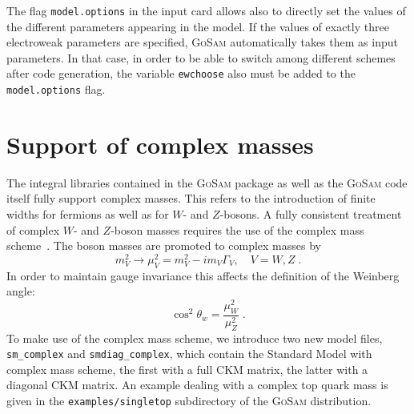 \documentclass[11pt,a4paper]{refrep}
\newcommand{\gosam}{\textsc{GoSam}\xspace}
\begin{document}
The flag {\tt model.options} in the input card allows also to directly
set the values of the different parameters appearing in the model. If
the values of exactly three electroweak parameters are
specified, \gosam{} automatically takes them as input parameters. In
that case, in order to be able to switch among different schemes after
code generation, the variable {\tt ewchoose} also must be added to the
{\tt model.options} flag.



\section{Support of complex masses}
\label{sec:complexmasses}
The integral libraries contained in the \gosam{} package as well as the \gosam{} 
code itself fully support complex masses. This refers to the introduction of 
finite widths for fermions as well as
for $W$- and $Z$-bosons. A fully consistent treatment of complex
$W$- and $Z$-boson masses requires the use of the complex mass scheme~\cite{Denner:2005fg}.
The boson masses are promoted to complex masses by
\begin{equation}
 m_{V}^2 \to \mu_{V}^2 = m_{V}^2 -i m_{V} \Gamma_{V},\quad V=W,Z\;.
\end{equation}
In order to maintain gauge invariance this affects the definition of the Weinberg angle:
\begin{equation}
 \cos^2\theta_w = \frac{\mu_W^2}{\mu_Z^2}\;.
\end{equation}
 To make use of the complex mass scheme, we introduce two new model files, \texttt{sm\_complex}
 and \texttt{smdiag\_complex}, which contain the Standard Model with complex mass scheme, the first
 with a full CKM matrix, the latter with a diagonal  CKM matrix.
 An example dealing with a complex top quark mass is given in 
 the {\tt examples/singletop} subdirectory of the \gosam{} distribution.
\end{document}
